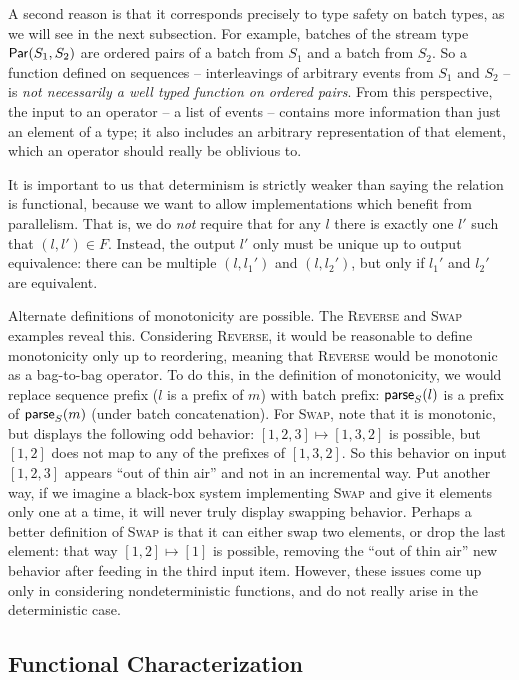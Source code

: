 A second reason is that it corresponds precisely to type safety on batch types, as we will see in the next subsection. For example, batches of the stream type $\parcomp{S_1}{S_2}$ are ordered pairs of a batch from $S_1$ and a batch from $S_2$. So a function defined on sequences -- interleavings of arbitrary events from $S_1$ and $S_2$ -- is \emph{not necessarily a well typed function on ordered pairs}.
From this perspective, the input to an operator -- a list of events -- contains more information than just an element of a type; it also includes an arbitrary representation of that element, which an operator should really be oblivious to.

It is important to us that determinism is strictly weaker than saying the relation is functional, because we want to allow implementations which benefit from parallelism. That is, we do \emph{not} require that for any $l$ there is exactly one $l'$ such that $(l, l') \in F$. Instead, the output $l'$ only must be unique up to output equivalence: there can be multiple $(l, l_1')$ and $(l, l_2')$, but only if $l_1'$ and $l_2'$ are equivalent.

Alternate definitions of monotonicity are possible.
The \textsc{Reverse} and \textsc{Swap} examples reveal this.
Considering \textsc{Reverse}, it would be reasonable to define monotonicity only up to reordering, meaning that \textsc{Reverse} would be monotonic as a bag-to-bag operator.
To do this, in the definition of monotonicity, we would replace sequence prefix ($l$ is a prefix of $m$) with batch prefix: $\parselin{l}{S}$ is a prefix of $\parselin{m}{S}$ (under batch concatenation).
For \textsc{Swap}, note that it is monotonic, but displays the following odd behavior: $[1, 2, 3] \mapsto [1, 3, 2]$ is possible, but $[1, 2]$ does not map to any of the prefixes of $[1, 3, 2]$. So this behavior on input $[1, 2, 3]$ appears ``out of thin air'' and not in an incremental way. Put another way, if we imagine a black-box system implementing \textsc{Swap} and give it elements only one at a time, it will never truly display swapping behavior. Perhaps a better definition of \textsc{Swap} is that it can either swap two elements, or drop the last element: that way $[1, 2] \mapsto [1]$ is possible, removing the ``out of thin air'' new behavior after feeding in the third input item. However, these issues come up only in considering nondeterministic functions,
and do not really arise in the deterministic case.

\subsection{Functional Characterization}

